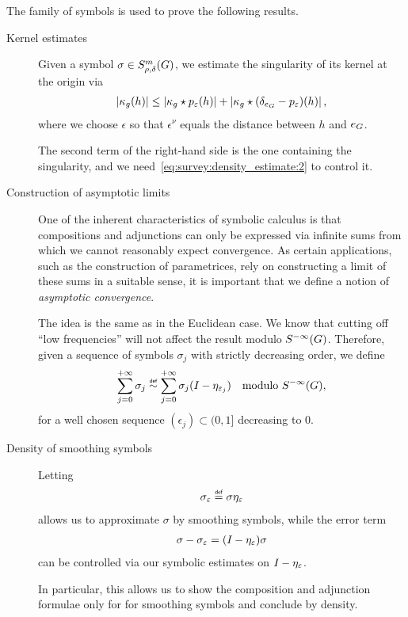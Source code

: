 The family of symbols is used to prove the following results.
\begin{description}
    \item[Kernel estimates]

        Given a symbol $\sigma \in S^{m}_{\rho, \delta}(G)$,
        we estimate the singularity of its kernel at the origin via
        \begin{align*}
            \left|{\kappa_g(h)}\right|
            \leq
            \left|{\kappa_g \star p_\varepsilon(h)}\right|
            +
            \left|{\kappa_g \star (\delta_{e_G} - p_\varepsilon)(h)}\right|,
        \end{align*}
        where we choose $\epsilon$ so that $\epsilon^\nu$ equals the distance between $h$ and $e_G$.

        The second term of the right-hand side is the one containing the singularity,
        and we need~\eqref{eq:survey:density_estimate:2} to control it.

    \item[Construction of asymptotic limits]

        One of the inherent characteristics of symbolic calculus is that compositions and adjunctions can only be expressed via infinite sums from which we cannot reasonably expect convergence.
        As certain applications, such as the construction of parametrices, rely on constructing a limit of these sums in a suitable sense,
        it is important that we define a notion of \emph{asymptotic convergence}.

        The idea is the same as in the Euclidean case.
        We know that cutting off ``low frequencies'' will not affect the result modulo ${S^{-\infty} (G)}$.
        Therefore, given a sequence of symbols $\sigma_j$ with strictly decreasing order,
        we define
        \begin{align*}
            \sum_{j = 0}^{+\infty} \sigma_j \defsim
            \sum_{j = 0}^{+\infty} \sigma_j (\Id {} - \eta_{\epsilon_j})
            \quad \text{modulo } \SmoothingSymbols,
        \end{align*}
        for a well chosen sequence $(\epsilon_j) \subset (0, 1]$ decreasing to $0$.

    \item[Density of smoothing symbols]

        Letting
        \begin{align*}
            \sigma_\epsilon \defeq \sigma \eta_\epsilon
        \end{align*}
        allows us to approximate $\sigma$ by smoothing symbols,
        while the error term
        \begin{align*}
            \sigma - \sigma_\varepsilon = ({I_{}} - \eta_\varepsilon) \sigma
        \end{align*}
        can be controlled via our symbolic estimates on ${I_{}} - \eta_\varepsilon$.

        In particular,
        this allows us to show the composition and adjunction formulae only for
        for smoothing symbols and conclude by density.
\end{description}

